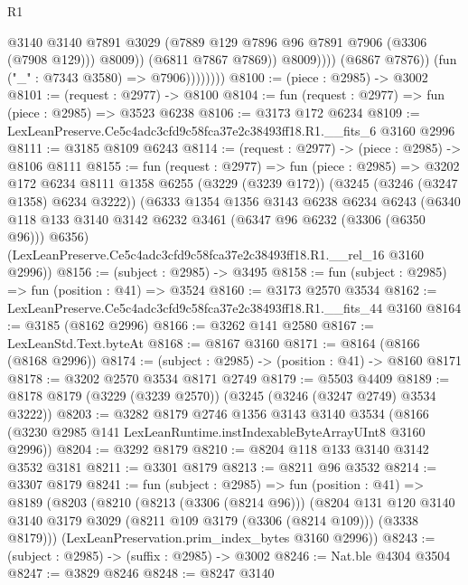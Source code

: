 \begin{lexlean}{R1}
\begin{coremodule}
                                  @3140
                                  @3140
                                  @7891
                                  @3029
                                  (@7889 @129 @7896 @96 @7891 @7906 (@3306 (@7908 @129)))
                                  @8009))
                              (@6811 @7867 @7869))
                            @8009))))
                    (@6867 @7876))
                  (fun ("_" : @7343 @3580) => @7906))))))))
@8100 := (piece : @2985) -> @3002
@8101 := (request : @2977) -> @8100
@8104 := fun (request : @2977) => fun (piece : @2985) => @3523 @6238
@8106 := @3173 @172 @6234
@8109 := LexLeanPreserve.Ce5c4adc3cfd9c58fca37e2c38493ff18.R1.__fits_6 @3160 @2996
@8111 := @3185 @8109 @6243
@8114 := (request : @2977) -> (piece : @2985) -> @8106 @8111
@8155 := fun (request : @2977) =>
  fun (piece : @2985) =>
  @3202
    @172
    @6234
    @8111
    @1358
    @6255
    (@3229 (@3239 @172))
    (@3245 (@3246 (@3247 @1358) @6234 @3222))
    (@6333
      @1354
      @1356
      @3143
      @6238
      @6234
      @6243
      (@6340 @118 @133 @3140 @3142 @6232 @3461 (@6347 @96 @6232 (@3306 (@6350 @96))) @6356)
      (LexLeanPreserve.Ce5c4adc3cfd9c58fca37e2c38493ff18.R1.__rel_16 @3160 @2996))
@8156 := (subject : @2985) -> @3495
@8158 := fun (subject : @2985) => fun (position : @41) => @3524
@8160 := @3173 @2570 @3534
@8162 := LexLeanPreserve.Ce5c4adc3cfd9c58fca37e2c38493ff18.R1.__fits_44 @3160
@8164 := @3185 (@8162 @2996)
@8166 := @3262 @141 @2580
@8167 := LexLeanStd.Text.byteAt
@8168 := @8167 @3160
@8171 := @8164 (@8166 (@8168 @2996))
@8174 := (subject : @2985) -> (position : @41) -> @8160 @8171
@8178 := @3202 @2570 @3534 @8171 @2749
@8179 := @5503 @4409
@8189 := @8178 @8179 (@3229 (@3239 @2570)) (@3245 (@3246 (@3247 @2749) @3534 @3222))
@8203 := @3282
    @8179
    @2746
    @1356
    @3143
    @3140
    @3534
    (@8166 (@3230 @2985 @141 LexLeanRuntime.instIndexableByteArrayUInt8 @3160 @2996))
@8204 := @3292 @8179
@8210 := @8204 @118 @133 @3140 @3142 @3532 @3181
@8211 := @3301 @8179
@8213 := @8211 @96 @3532
@8214 := @3307 @8179
@8241 := fun (subject : @2985) =>
  fun (position : @41) =>
  @8189
    (@8203
      (@8210
        (@8213 (@3306 (@8214 @96)))
        (@8204
          @131
          @120
          @3140
          @3140
          @3179
          @3029
          (@8211 @109 @3179 (@3306 (@8214 @109)))
          (@3338 @8179)))
      (LexLeanPreservation.prim_index_bytes @3160 @2996))
@8243 := (subject : @2985) -> (suffix : @2985) -> @3002
@8246 := Nat.ble @4304 @3504
@8247 := @3829 @8246
@8248 := @8247 @3140

\end{coremodule}
\end{lexlean}
